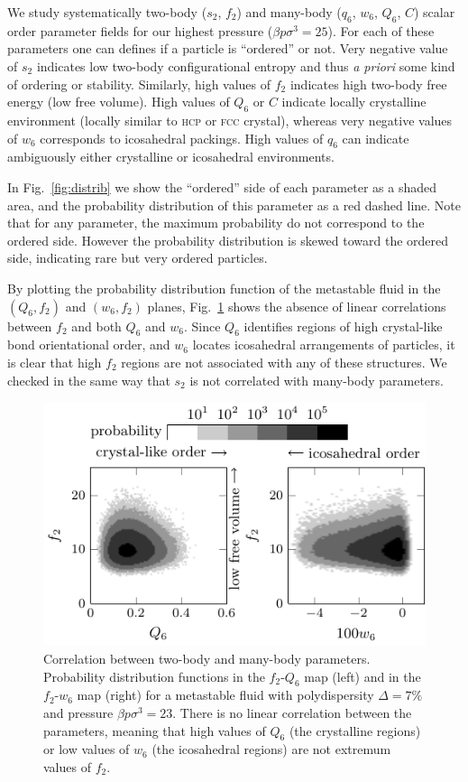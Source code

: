 \documentclass[twocolumn,superscriptaddress]{revtex4}
\begin{document}
We study systematically two-body ($s_2$, $f_2$) and many-body ($q_6$, $w_6$, $Q_6$, $C$) scalar order parameter fields for our highest pressure ($\beta p\sigma^3=25$). For each of these parameters one can defines if a particle is ``ordered'' or not. Very negative value of $s_2$ indicates low two-body configurational entropy and thus \emph{a priori} some kind of ordering or stability. Similarly, high values of $f_2$ indicates high two-body free energy (low free volume). High values of $Q_6$ or $C$ indicate locally crystalline environment (locally similar to \textsc{hcp} or \textsc{fcc} crystal), whereas very negative values of $w_6$ corresponds to icosahedral packings. High values of $q_6$ can indicate ambiguously either crystalline or icosahedral environments.

In Fig.~\ref{fig:distrib} we show the ``ordered'' side of each parameter as a shaded area, and the probability distribution of this parameter as a red dashed line. Note that for any parameter, the maximum probability do not correspond to the ordered side. However the probability distribution is skewed toward the ordered side, indicating rare but very ordered particles.

By plotting the probability distribution function of the metastable fluid in the $(Q_6, f_2)$ and $(w_6, f_2)$ planes, Fig.~\ref{fig:f2decoupling} shows the absence of linear correlations between $f_2$ and both $Q_6$ and $w_6$. Since $Q_6$ identifies regions of high crystal-like bond orientational order, and $w_6$ locates icosahedral arrangements of particles, it is clear that high $f_2$ regions are not associated with any of these structures. We checked in the same way that $s_2$ is not correlated with many-body parameters.


\begin{figure}
 \centering
 \includegraphics{fig_f2decoupling}
 \caption{Correlation between two-body and many-body parameters. Probability distribution functions in the $f_2$-$Q_6$ map (left) and in the $f_2$-$w_6$ map (right) for a metastable fluid with polydispersity $\Delta=7\%$ and pressure $\beta p\sigma^3=23$. There is no linear correlation between the parameters, meaning
 that high values of $Q_6$ (the crystalline regions) or low values of $w_6$ (the icosahedral regions) are not extremum values of $f_2$.}
 \label{fig:f2decoupling}
\end{figure}
\end{document}
